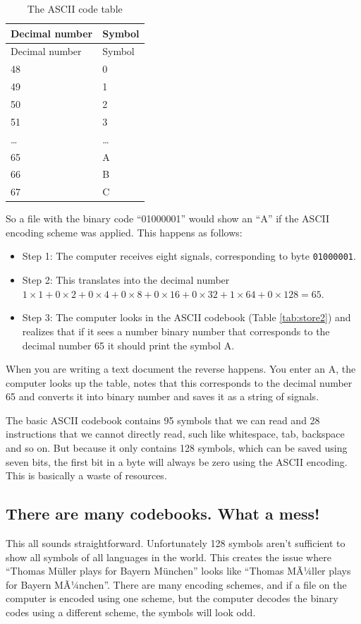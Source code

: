 \documentclass[]{book}
\providecommand{\tightlist}{%
  \setlength{\itemsep}{0pt}\setlength{\parskip}{0pt}}
\begin{document}
\begin{longtable}[]{@{}ll@{}}
\caption{\label{tab:storet1} The ASCII code table}\tabularnewline
\toprule
Decimal number & Symbol\tabularnewline
\midrule
\endfirsthead
\toprule
Decimal number & Symbol\tabularnewline
\midrule
\endhead
48 & 0\tabularnewline
49 & 1\tabularnewline
50 & 2\tabularnewline
51 & 3\tabularnewline
\ldots{} & \ldots{}\tabularnewline
65 & A\tabularnewline
66 & B\tabularnewline
67 & C\tabularnewline
\bottomrule
\end{longtable}

So a file with the binary code ``01000001'' would show an ``A'' if the ASCII encoding scheme was applied. This happens as follows:

\begin{itemize}
\tightlist
\item
  Step 1: The computer receives eight signals, corresponding to byte \texttt{01000001}.
\item
  Step 2: This translates into the decimal number \(1 \times 1+0\times 2+0\times 4 +0\times 8 +0\times 16 +0\times 32 +1\times 64 +0\times 128=65\).
\item
  Step 3: The computer looks in the ASCII codebook (Table \ref{tab:store2}) and realizes that if it sees a number binary number that corresponds to the decimal number 65 it should print the symbol A.
\end{itemize}

When you are writing a text document the reverse happens. You enter an A, the computer looks up the table, notes that this corresponds to the decimal number 65 and converts it into binary number and saves it as a string of signals.

The basic ASCII codebook contains 95 symbols that we can read and 28 instructions that we cannot directly read, such like whitespace, tab, backspace and so on. But because it only contains 128 symbols, which can be saved using seven bits, the first bit in a byte will always be zero using the ASCII encoding. This is basically a waste of resources.

\hypertarget{there-are-many-codebooks.-what-a-mess}{%
\subsection{There are many codebooks. What a mess!}\label{there-are-many-codebooks.-what-a-mess}}

This all sounds straightforward. Unfortunately 128 symbols aren't sufficient to show all symbols of all languages in the world. This creates the issue where ``Thomas Müller plays for Bayern München'' looks like ``Thomas MÃ¼ller plays for Bayern MÃ¼nchen''. There are many encoding schemes, and if a file on the computer is encoded using one scheme, but the computer decodes the binary codes using a different scheme, the symbols will look odd.
\end{document}
